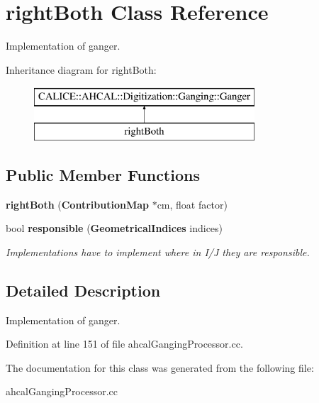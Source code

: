 \section{right\-Both Class Reference}
\label{classrightBoth}


Implementation of ganger.  


Inheritance diagram for right\-Both\-:\begin{figure}[H]
\begin{center}
\leavevmode
\includegraphics[height=2.000000cm]{classrightBoth}
\end{center}
\end{figure}
\subsection*{Public Member Functions}
\begin{DoxyCompactItemize}
\item 
{\bfseries right\-Both} ({\bf Contribution\-Map} $\ast$cm, float factor)\label{classrightBoth_a3fedb57d99908019a6e9beda9274686c}

\item 
bool {\bf responsible} ({\bf Geometrical\-Indices} indices)\label{classrightBoth_a5b87c7eaa01c916053e5e66b250c43b8}

\begin{DoxyCompactList}\small\item\em Implementations have to implement where in I/\-J they are responsible. \end{DoxyCompactList}\end{DoxyCompactItemize}


\subsection{Detailed Description}
Implementation of ganger. 

Definition at line 151 of file ahcal\-Ganging\-Processor.\-cc.



The documentation for this class was generated from the following file\-:\begin{DoxyCompactItemize}
\item 
ahcal\-Ganging\-Processor.\-cc\end{DoxyCompactItemize}
